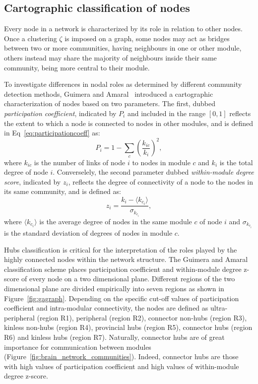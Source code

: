 \subsection{Cartographic classification of nodes}
Every node in a network is characterized by its role in relation to other nodes.
Once a clustering $\zeta$ is imposed on a graph, some nodes may act as bridges between two or more communities, having neighbours in one or other module, others instead may share the majority of neighbours inside their same community, being more central to their module.

To investigate differences in nodal roles as determined by different community detection methods, Guimera and Amaral~\cite{guimera2005} introduced a cartographic characterization of nodes based on two parameters.
The first, dubbed \emph{participation coefficient}, indicated by $P_i$ and included in the range $[0,1]$ reflects the extent to which a node is connected to nodes in other modules, and is defined in Eq~\ref{eq:participationcoeff} as:
\begin{equation}\label{eq:participationcoeff}
P_i = 1 - \sum_c \left( \frac{k_{ic}}{k_i} \right)^2,
\end{equation}
where $k_{ic}$ is the number of links of node $i$ to nodes in module $c$ and $k_i$ is the total degree of node $i$.
Converselely, the second parameter dubbed \emph{within-module degree score}, indicated by $z_i$,  reflects the degree of connectivity of a node to the nodes in its same community, and is defined as: 
\begin{equation}\label{eq:withinmoduledegree}
z_i = \frac{k_i - \langle  k_{c_i} \rangle }{\sigma_{k_{c_i}}},
\end{equation}
where $\langle  k_{c_i} \rangle $ is the average degree of nodes in the same module $c$ of node $i$ and $\sigma_{k_{c_i}}$ is the standard deviation of degrees of nodes in module $c$.

Hubs classification is critical for the interpretation of the roles played by the highly connected nodes within the network structure.
The Guimera and Amaral~\cite{guimera2005} classification scheme places participation coefficient and within-module degree z-score of every node on a two dimensional plane.
Different regions of the two dimensional plane are divided empirically into seven regions as shown in Figure~\ref{fig:gagraph}.
Depending on the specific cut-off values of participation coefficient and intra-modular connectivity, the nodes are defined as ultra-peripheral (region R1), peripheral (region R2), connector non-hubs (region R3), kinless non-hubs (region R4), provincial hubs (region R5), connector hubs (region R6) and kinless hubs (region R7).
Naturally, connector hubs are of great importance for communication between modules (Figure~\ref{fig:brain_network_communities}).
Indeed, connector hubs are those with high values of participation coefficient and high values of within-module degree z-score.

